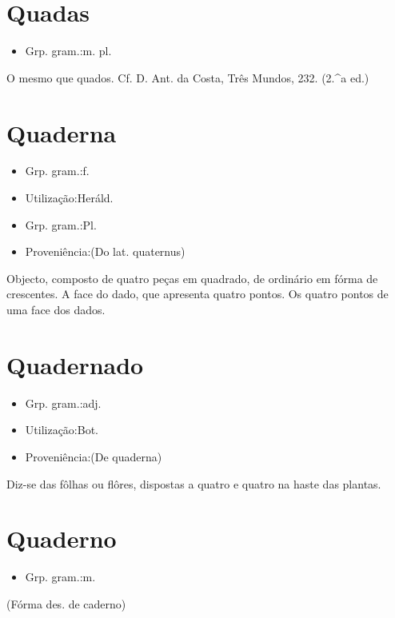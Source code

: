 \section{Quadas}
\begin{itemize}
\item {Grp. gram.:m. pl.}
\end{itemize}
O mesmo que \textunderscore quados\textunderscore . Cf. D. Ant. da Costa, \textunderscore Três Mundos\textunderscore , 232. (2.^a ed.)
\section{Quaderna}
\begin{itemize}
\item {Grp. gram.:f.}
\end{itemize}
\begin{itemize}
\item {Utilização:Heráld.}
\end{itemize}
\begin{itemize}
\item {Grp. gram.:Pl.}
\end{itemize}
\begin{itemize}
\item {Proveniência:(Do lat. \textunderscore quaternus\textunderscore )}
\end{itemize}
Objecto, composto de quatro peças em quadrado, de ordinário em fórma de crescentes.
A face do dado, que apresenta quatro pontos.
Os quatro pontos de uma face dos dados.
\section{Quadernado}
\begin{itemize}
\item {Grp. gram.:adj.}
\end{itemize}
\begin{itemize}
\item {Utilização:Bot.}
\end{itemize}
\begin{itemize}
\item {Proveniência:(De \textunderscore quaderna\textunderscore )}
\end{itemize}
Diz-se das fôlhas ou flôres, dispostas a quatro e quatro na haste das plantas.
\section{Quaderno}
\begin{itemize}
\item {Grp. gram.:m.}
\end{itemize}
(Fórma des. de \textunderscore caderno\textunderscore )
